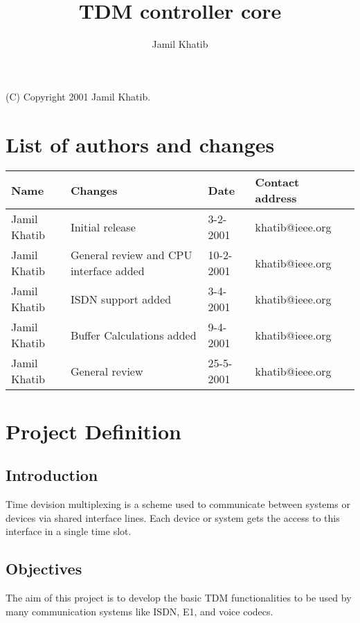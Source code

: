 \documentclass[a4paper,11pt]{article}
\author{Jamil Khatib}
\title{TDM controller core}
\newcommand{\addauthor}[4]{#1 & #2 & #3 & #4 \\ \hline}
\begin{document}
\maketitle

\begin{center}(C) Copyright 2001 Jamil Khatib.\end{center}

\thispagestyle{empty}

\newpage


\tableofcontents


\newpage

\section{List of authors and changes}

\begin{tabular}{|l|l|l|l|l|}
\hline
Name & Changes & Date & Contact address\\
\hline
\hline 

\addauthor{Jamil Khatib}{Initial release}{3-2-2001}{khatib@ieee.org}
\addauthor{Jamil Khatib}{General review and CPU interface added}{10-2-2001}{khatib@ieee.org}
\addauthor{Jamil Khatib}{ISDN support added}{3-4-2001}{khatib@ieee.org}
\addauthor{Jamil Khatib}{Buffer Calculations added}{9-4-2001}{khatib@ieee.org}
\addauthor{Jamil Khatib}{General review}{25-5-2001}{khatib@ieee.org}


\end{tabular}

\newpage

\section{Project Definition}

\subsection{Introduction}
Time devision multiplexing is a scheme used to communicate between systems or devices via shared interface lines. Each device or system gets the access to this interface in a single time slot.

\subsection{Objectives}
The aim of this project is to develop the basic TDM functionalities to be used by many communication systems like ISDN, E1, and voice codecs.
\end{document}
